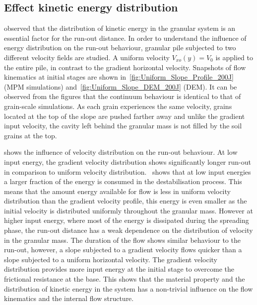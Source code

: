 
\subsection*{Effect kinetic energy distribution}

\citet{Staron2005} observed that the distribution of kinetic energy in the 
granular system is an essential factor for the run-out distance. In order to 
understand the influence of energy distribution on the run-out behaviour, 
granular pile subjected to two different velocity fields are studied. A 
uniform velocity $V_{xo} (y) = V_0$ is applied to the entire pile, in contrast 
to the gradient horizontal velocity. Snapshots of flow kinematics at initial 
stages are shown in~\cref{fig:Uniform_Slope_Profile_200J} (MPM simulations) 
and~\cref{fig:Uniform_Slope_DEM_200J} (DEM). It can be observed from the 
figures that the continuum behaviour is identical to that of grain-scale 
simulations. As each grain experiences the same velocity, grains located at the 
top of the slope are pushed farther away and unlike the gradient input 
velocity, the cavity left behind the granular mass is not filled by the soil 
grains at the top. 

 shows the influence of velocity distribution on the 
run-out behaviour. At low input energy, the gradient velocity distribution 
shows significantly longer run-out in comparison to uniform velocity 
distribution.~ shows that at low input energies a larger 
fraction of the energy is consumed in the destabilisation process. This means 
that the amount energy available for flow is less in uniform velocity 
distribution than the gradient velocity profile, this energy is even smaller as 
the initial velocity is distributed uniformly throughout the granular mass. 
However at higher input energy, where most of the energy is dissipated during 
the spreading phase, the run-out distance has a weak dependence on the 
distribution of velocity in the granular mass. The duration of the flow shows 
similar behaviour to the run-out, however, a slope subjected to a gradient 
velocity flows quicker than a slope subjected to a uniform horizontal velocity. 
The gradient velocity distribution provides more input energy at the initial 
stage to overcome the frictional resistance at the base. This shows that the 
material property and the distribution of kinetic energy in the system has a 
non-trivial influence on the flow kinematics and the internal flow structure.



